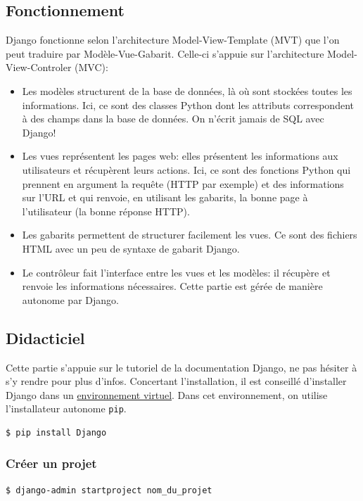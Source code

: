 \documentclass[a4paper, 10pt]{article}
\begin{document}
\subsection{Fonctionnement}

Django fonctionne selon l'architecture Model-View-Template (MVT) que l'on peut traduire par Modèle-Vue-Gabarit. Celle-ci s’appuie sur l'architecture Model-View-Controler (MVC):
\begin{itemize}
	\item Les modèles structurent de la base de données, là où sont stockées toutes les informations. Ici, ce sont des classes Python dont les attributs correspondent à des champs dans la base de données. On n'écrit jamais de SQL avec Django!
	\item Les vues représentent les pages web: elles présentent les informations aux utilisateurs et récupèrent leurs actions. Ici, ce sont des fonctions Python qui prennent en argument la requête (HTTP par exemple) et des informations sur l’URL et qui renvoie, en utilisant les gabarits, la bonne page à l'utilisateur (la bonne réponse HTTP).
	\item Les gabarits permettent de structurer facilement les vues. Ce sont des fichiers HTML avec un peu de syntaxe de gabarit Django.
	\item Le contrôleur fait l'interface entre les vues et les modèles: il récupère et renvoie les informations nécessaires. Cette partie est gérée de manière autonome par Django.
\end{itemize}

\subsection{Didacticiel}
Cette partie s'appuie sur le tutoriel de la documentation Django, ne pas hésiter à s'y rendre pour plus d'infos. Concertant l'installation, il est conseillé d'installer Django dans un \hyperref[virtualenv]{environnement virtuel}. Dans cet environnement, on utilise l'installateur autonome \texttt{pip}.

\begin{verbatim}
$ pip install Django
\end{verbatim}

\subsubsection{Créer un projet}
\begin{verbatim}
$ django-admin startproject nom_du_projet
\end{verbatim}
\end{document}
